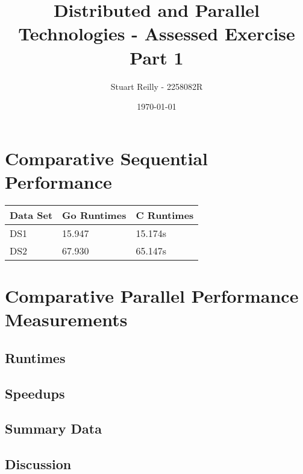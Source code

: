 \documentclass[11pt,a4paper,titlepage]{article}
\begin{document}
\title{Distributed and Parallel Technologies - Assessed Exercise Part 1}
\author{Stuart Reilly - 2258082R}
\date{\today}
\maketitle

\section{Comparative Sequential Performance}

\begin{table}[]
\begin{tabular}{|l|l|l|}
\hline
Data Set & Go Runtimes & C Runtimes \\ \hline
DS1 & 15.947 & 15.174s \\ \hline
DS2 & 67.930 & 65.147s \\ \hline
\end{tabular}
\end{table}

\section{Comparative Parallel Performance Measurements}
\subsection{Runtimes}

\subsection{Speedups}

\subsection{Summary Data}

\subsection{Discussion}
\end{document}
